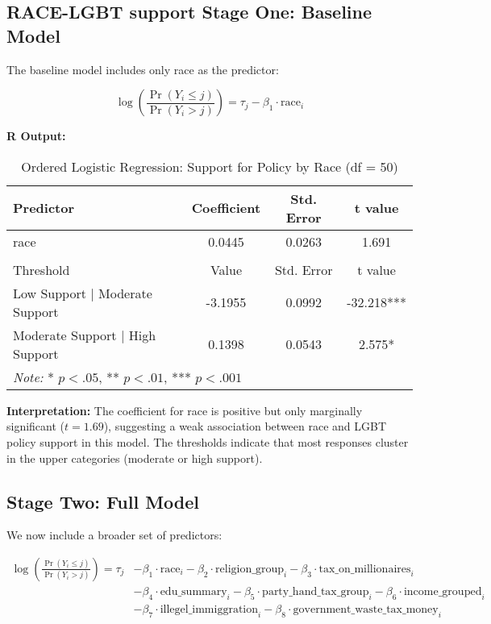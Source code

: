 \documentclass{article}
\begin{document}

\subsection{RACE-LGBT support Stage One: Baseline Model}

The baseline model includes only race as the predictor:

\[
\log \left( \frac{\Pr(Y_i \leq j)}{\Pr(Y_i > j)} \right) = \tau_j - \beta_1 \cdot \text{race}_i
\]

\vspace{0.5em}
\noindent
\textbf{R Output:}
\begin{table}[H]
    \centering
    \caption{Ordered Logistic Regression: Support for Policy by Race (df = 50)}
    \begin{tabular}{lccc}
    \hline
    \textbf{Predictor} & \textbf{Coefficient} & \textbf{Std. Error} & \textbf{t value} \\
    \hline
    race & 0.0445 & 0.0263 & 1.691 \\
    \hline
    \addlinespace[0.5em]
    \multicolumn{4}{l}{\textbf{Intercepts}} \\
    \hline
    Threshold & Value & Std. Error & t value \\
    \hline
    Low Support $|$ Moderate Support & -3.1955 & 0.0992 & -32.218*** \\
    Moderate Support $|$ High Support & 0.1398 & 0.0543 & 2.575* \\
    \hline
    \multicolumn{4}{l}{\textit{Note:} * $p < .05$, ** $p < .01$, *** $p < .001$} \\
    \end{tabular}
\end{table}


\noindent
\textbf{Interpretation:} The coefficient for race is positive but only marginally significant (\( t = 1.69 \)), suggesting a weak association between race and LGBT policy support in this model. The thresholds indicate that most responses cluster in the upper categories (moderate or high support).

\subsection{Stage Two: Full Model}

We now include a broader set of predictors:

\[
\begin{aligned}
\log \left( \frac{\Pr(Y_i \leq j)}{\Pr(Y_i > j)} \right) = \tau_j 
& - \beta_1 \cdot \text{race}_i 
- \beta_2 \cdot \text{religion\_group}_i 
- \beta_3 \cdot \text{tax\_on\_millionaires}_i \\
& - \beta_4 \cdot \text{edu\_summary}_i
- \beta_5 \cdot \text{party\_hand\_tax\_group}_i 
- \beta_6 \cdot \text{income\_grouped}_i \\
& - \beta_7 \cdot \text{illegel\_immiggration}_i
- \beta_8 \cdot \text{government\_waste\_tax\_money}_i
\end{aligned}
\]
\end{document}
